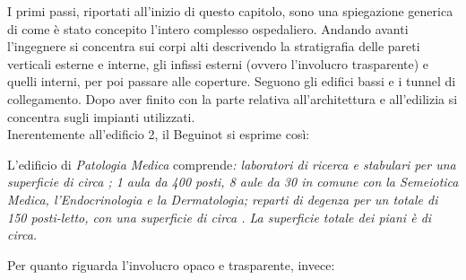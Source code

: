 I primi passi, riportati all'inizio di questo capitolo, sono una spiegazione generica di come è stato concepito l'intero complesso ospedaliero. Andando avanti l'ingegnere si concentra sui corpi alti descrivendo la stratigrafia delle pareti verticali esterne e interne, gli infissi esterni (ovvero l'involucro trasparente) e quelli interni, per poi passare alle coperture. Seguono gli edifici bassi e i tunnel di collegamento. Dopo aver finito con la parte relativa all'architettura e all'edilizia si concentra sugli impianti utilizzati.\\
Inerentemente all'edificio 2, il Beguinot si esprime così:
\begin{quoting}
	L'edificio di \emph{Patologia Medica} comprende\emph{: laboratori di ricerca e stabulari per una superficie di circa ; 1 aula da \num{400} posti, \num{8} aule da \num{30} in comune con la Semeiotica Medica, l'Endocrinologia e la Dermatologia; reparti di degenza per un totale di \num{150} posti-letto, con una superficie di circa . La superficie totale dei piani è di  circa.}
\end{quoting}
Per quanto riguarda l'involucro opaco e trasparente, invece:
